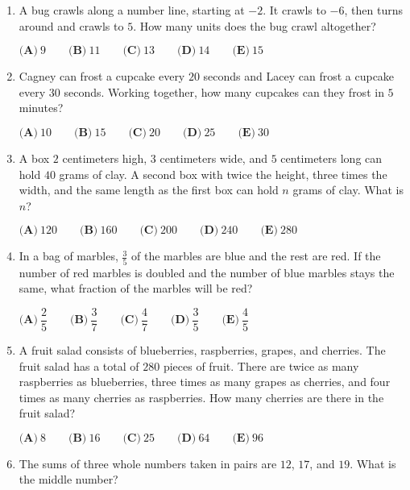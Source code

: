\documentclass{article}
\begin{document}
\begin{enumerate}[label=\arabic*., itemsep=0.5em]\item A bug crawls along a number line, starting at \(-2\). It crawls to \(-6\), then turns around and crawls to \(5\). How many units does the bug crawl altogether?

\( \textbf{(A)}\ 9\qquad\textbf{(B)}\ 11\qquad\textbf{(C)}\ 13\qquad\textbf{(D)}\ 14\qquad\textbf{(E)}\ 15 \)\par \vspace{0.5em}\item Cagney can frost a cupcake every \(20\) seconds and Lacey can frost a cupcake every \(30\) seconds. Working together, how many cupcakes can they frost in \(5\) minutes?

\( \textbf{(A)}\ 10\qquad\textbf{(B)}\ 15\qquad\textbf{(C)}\ 20\qquad\textbf{(D)}\ 25\qquad\textbf{(E)}\ 30 \)\par \vspace{0.5em}\item A box \(2\) centimeters high, \(3\) centimeters wide, and \(5\) centimeters long can hold \(40\) grams of clay.  A second box with twice the height, three times the width, and the same length as the first box can hold \(n\) grams of clay.  What is \(n\)?

\(\textbf{(A)}\ 120\qquad\textbf{(B)}\ 160\qquad\textbf{(C)}\ 200\qquad\textbf{(D)}\ 240\qquad\textbf{(E)}\ 280\)\par \vspace{0.5em}\item In a bag of marbles, \(\tfrac{3}{5}\) of the marbles are blue and the rest are red.  If the number of red marbles is doubled and the number of blue marbles stays the same, what fraction of the marbles will be red?

\( \textbf{(A)}\ \dfrac{2}{5}
\qquad\textbf{(B)}\ \dfrac{3}{7}
\qquad\textbf{(C)}\ \dfrac{4}{7}
\qquad\textbf{(D)}\ \dfrac{3}{5}
\qquad\textbf{(E)}\ \dfrac{4}{5}
 \)\par \vspace{0.5em}\item A fruit salad consists of blueberries, raspberries, grapes, and cherries.  The fruit salad has a total of \(280\) pieces of fruit.  There are twice as many raspberries as blueberries, three times as many grapes as cherries, and four times as many cherries as raspberries.  How many cherries are there in the fruit salad?

\( \textbf{(A)}\ 8\qquad\textbf{(B)}\ 16\qquad\textbf{(C)}\ 25\qquad\textbf{(D)}\ 64\qquad\textbf{(E)}\ 96 \)\par \vspace{0.5em}\item The sums of three whole numbers taken in pairs are \(12\), \(17\), and \(19\).  What is the middle number?


\end{enumerate}
\end{document}
